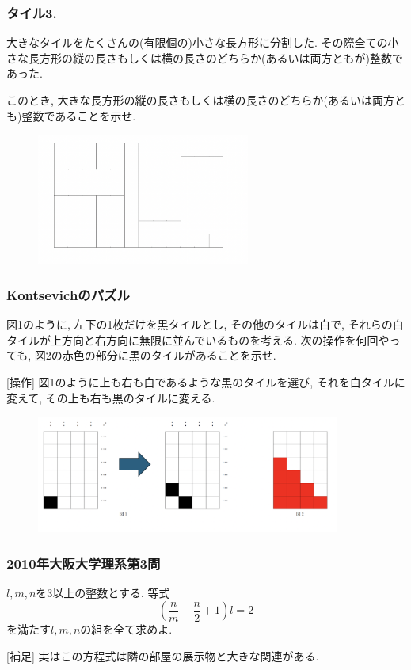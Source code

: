 \documentclass[11pt,dvipdfmx]{beamer}
\theoremstyle{definition}
\theoremstyle{remark}
\begin{document}
\begin{frame}
\frametitle{タイル3. }
大きなタイルをたくさんの(有限個の)小さな長方形に分割した. 
その際全ての小さな長方形の縦の長さもしくは横の長さのどちらか(あるいは両方ともが)整数であった.

\vspace{5pt}
このとき, 大きな長方形の縦の長さもしくは横の長さのどちらか(あるいは両方とも)整数であることを示せ.
\begin{figure}[htbp]
\begin{center}
\includegraphics[width=70mm]{tile3.png}
\end{center}
\end{figure}
\end{frame}


\begin{frame}
\frametitle{Kontsevichのパズル}
図1のように, 左下の1枚だけを黒タイルとし, その他のタイルは白で, それらの白タイルが上方向と右方向に無限に並んでいるものを考える.
次の操作を何回やっても, 図2の赤色の部分に黒のタイルがあることを示せ. 

\vspace{5pt}
[操作] 図1のように上も右も白であるような黒のタイルを選び, それを白タイルに変えて, その上も右も黒のタイルに変える.

\begin{figure}[htbp]
\begin{center}
\includegraphics[width=100mm]{kont.png}
\end{center}
\end{figure}
\end{frame}



\begin{frame}
\frametitle{2010年大阪大学理系第3問}
$l,m,n$を3以上の整数とする. 等式
$$
\left( \frac{n}{m} - \frac{n}{2} + 1 \right)l = 2
$$
を満たす$l,m,n$の組を全て求めよ. 

\vspace{20pt}
{\footnotesize
[補足] 実はこの方程式は隣の部屋の展示物と大きな関連がある. 
}
\end{frame}
\end{document}
